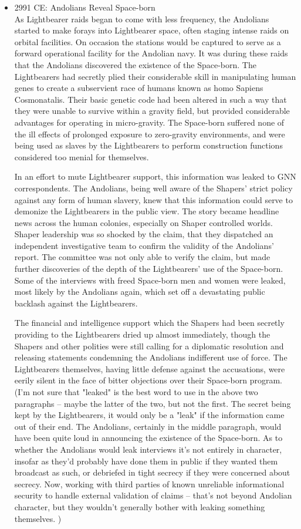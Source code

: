 \begin{itemize}
\item 2991 CE: Andolians Reveal Space-born \\

As Lightbearer raids began to come with less frequency, the Andolians
started to make forays into Lightbearer space, often staging intense
raids on orbital facilities.  On occasion the stations would be
captured to serve as a forward operational facility for the Andolian
navy.  It was during these raids that the Andolians discovered the
existence of the Space-born.  The Lightbearers had secretly plied their
considerable skill in manipulating human genes to create a subservient
race of humans known as homo Sapiens Cosmonatalis.  Their basic
genetic code had been altered in such a way that they were unable to
survive within a gravity field, but provided considerable advantages
for operating in micro-gravity.  The Space-born suffered none of the
ill effects of prolonged exposure to zero-gravity environments, and
were being used as slaves by the Lightbearers to perform construction
functions considered too menial for themselves.

In an effort to mute Lightbearer support, this information was leaked
to GNN correspondents.  The Andolians, being well aware of the
Shapers' strict policy against any form of human slavery, knew that
this information could serve to demonize the Lightbearers in the
public view.  The story became headline news across the human
colonies, especially on Shaper controlled worlds.  Shaper leadership
was so shocked by the claim, that they dispatched an independent
investigative team to confirm the validity of the Andolians' report.
The committee was not only able to verify the claim, but made further
discoveries of the depth of the Lightbearers' use of the Space-born.
Some of the interviews with freed Space-born men and women were leaked,
most likely by the Andolians again, which set off a devastating public
backlash against the Lightbearers.

The financial and intelligence support which the Shapers had been
secretly providing to the Lightbearers dried up almost immediately,
though the Shapers and other polities were still calling for a
diplomatic resolution and releasing statements condemning the
Andolians indifferent use of force.  The Lightbearers themselves,
having little defense against the accusations, were eerily silent in
the face of bitter objections over their Space-born program. (I'm not
sure that "leaked" is the best word to use in the above two
paragraphs -- maybe the latter of the two, but not the first. The
secret being kept by the Lightbearers, it would only be a "leak" if
the information came out of their end. The Andolians, certainly in the
middle paragraph, would have been quite loud in announcing the
existence of the Space-born. As to whether the Andolians would leak
interviews it's not entirely in character, insofar as they'd
probably have done them in public if they wanted them broadcast as
such, or debriefed in tight secrecy if they were concerned about
secrecy. Now, working with third parties of known unreliable
informational security to handle external validation of claims -- that's not beyond Andolian character, but they wouldn't generally bother
with leaking something themselves. )


\end{itemize}

